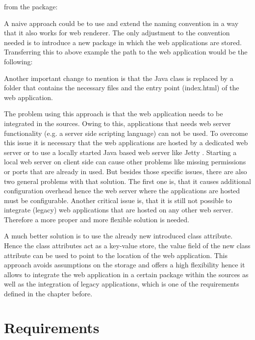 from the package:  

\indent \centerline{}

A naive approach could be to use and extend the naming convention in a way that it also works for web renderer.
The only adjustment to the convention needed is to introduce a new package in which the web applications are stored.
Transferring this to  above example the path to the web application would be the following:

\indent \centerline{}

Another important change to mention is that the Java class is replaced by a folder that contains the necessary files and the entry point (index.html) of the web application.

The problem using this approach is that the web application needs to be integrated in the sources.
Owing to this, applications that needs web server functionality (e.g.
a server side scripting language) can not be used.
To overcome this issue it is necessary that the web applications are hosted by a dedicated web server or to use a locally started Java based web server like Jetty \autocite{conception:jetty}.
Starting a local web server on client side can cause other problems like missing permissions or ports that are already in used.
But besides those specific issues, there are also two general problems with that solution.
The first one is, that it causes additional configuration overhead hence the web server where the applications are hosted must be configurable.
Another critical issue is, that it is still not possible to integrate (legacy) web applications that are hosted on any other web server.
Therefore a more proper and more flexible solution is needed.

A much better solution is to use the already new introduced class attribute.
Hence the class attributes act as a key-value store, the value field of the new class attribute can be used to point to the location of the web application.
This approach avoids assumptions on the storage and offers a high flexibility hence it allows to integrate the web application in a certain package within the sources as well as the integration of legacy applications, which is one of the requirements defined in the chapter before.

\section{Requirements}\label{chap:requirements}
